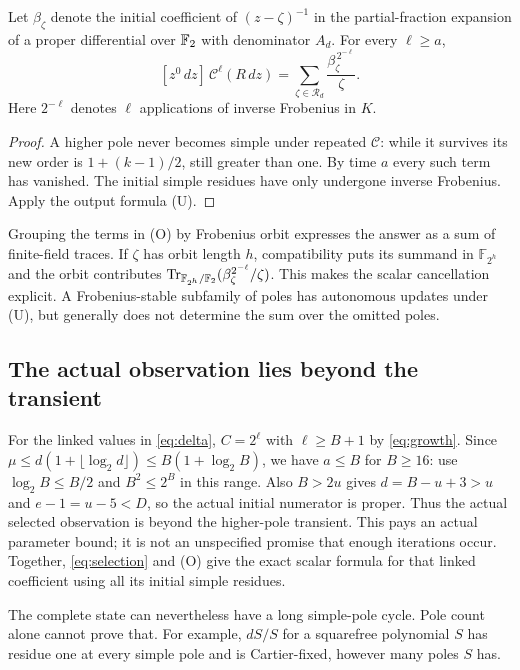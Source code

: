 \begin{corollary}
\label{cor:scalar-profile}
Let $\beta_\zeta$ denote the initial coefficient of
$(z-\zeta)^{-1}$ in the partial-fraction expansion of a
proper differential over $\mathbb F_2$ with denominator $A_d$.
For every $\ell\ge a$,
\[
 [z^0\,dz]\,\mathcal C^\ell(R\,dz)
   =\sum_{\zeta\in\mathcal R_d}
              \frac{\beta_\zeta^{\,2^{-\ell}}}{\zeta}.
 \tag{O}
\]
Here $2^{-\ell}$ denotes $\ell$ applications of inverse
Frobenius in $K$.
\end{corollary}
\begin{proof}
A higher pole never becomes simple under repeated
$\mathcal C$: while it survives its new order is
$1+(k-1)/2$, still greater than one. By time $a$ every
such term has vanished. The initial simple residues have
only undergone inverse Frobenius. Apply the output
formula (U).
\end{proof}

Grouping the terms in (O) by Frobenius orbit expresses the
answer as a sum of finite-field traces. If $\zeta$ has
orbit length $h$, compatibility puts its summand in
$\mathbb F_{2^h}$ and the orbit contributes
$\operatorname{Tr}_{\mathbb F_{2^h}/\mathbb F_2}
(\beta_\zeta^{2^{-\ell}}/\zeta)$.
This makes the scalar cancellation explicit.
A Frobenius-stable subfamily of poles has autonomous
updates under (U), but generally does not determine
the sum over the omitted poles.

\subsection{The actual observation lies beyond the transient}

For the linked values in \eqref{eq:delta}, $C=2^\ell$ with
$\ell\ge B+1$ by \eqref{eq:growth}. Since
$\mu\le d(1+\lfloor\log_2 d\rfloor)\le B(1+\log_2B)$,
we have $a\le B$ for $B\ge16$: use
$\log_2 B\le B/2$ and $B^2\le2^B$ in this range.
Also $B>2u$ gives $d=B-u+3>u$ and
$e-1=u-5<D$, so the actual initial numerator is proper.
Thus the actual selected observation
is beyond the higher-pole transient. This pays an actual parameter
bound; it is not an unspecified promise that enough iterations occur.
Together, \eqref{eq:selection} and (O) give the exact
scalar formula for that linked coefficient using all its
initial simple residues.

The complete state can nevertheless have a long simple-pole cycle.
Pole count alone cannot prove that. For example, $dS/S$ for a
squarefree polynomial $S$ has residue one at every simple pole and
is Cartier-fixed, however many poles $S$ has.

